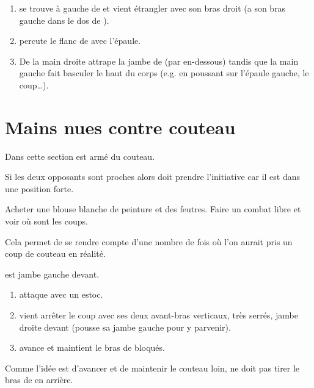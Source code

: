 \begin{technique}

\begin{enumerate}
	\item \A se trouve à gauche de \D et vient étrangler avec son bras droit (\D a son bras gauche dans le dos de \A).
	
	\item \D percute le flanc de \A avec l'épaule.
	
	\item De la main droite \D attrape la jambe de \A (par en-dessous) tandis que la main gauche fait basculer le haut du corps (e.g. en poussant sur l'épaule gauche, le coup…). 
\end{enumerate}

\end{technique}


\section{Mains nues contre couteau}


Dans cette section \A est armé du couteau.

Si les deux opposants sont proches alors \A doit prendre l'initiative car il est dans une position forte.


\begin{exercice}
Acheter une blouse blanche de peinture et des feutres.
Faire un combat libre et voir où sont les coups.

Cela permet de se rendre compte d'une nombre de fois où l'on aurait pris un coup de couteau en réalité.
\end{exercice}


\begin{exercice}
\label{cc:ex:blocage-estoc}

\D est jambe gauche devant.

\begin{enumerate}
	\item \A attaque \D avec un estoc.
	
	\item \D vient arrêter le coup avec ses deux avant-bras verticaux, très serrés, jambe droite devant (\D pousse sa jambe gauche pour y parvenir).
	
	\item \D avance et maintient le bras de \A bloqués.
\end{enumerate}

Comme l'idée est d'avancer et de maintenir le couteau loin, \D ne doit pas tirer le bras de \A en arrière.

\end{exercice}


